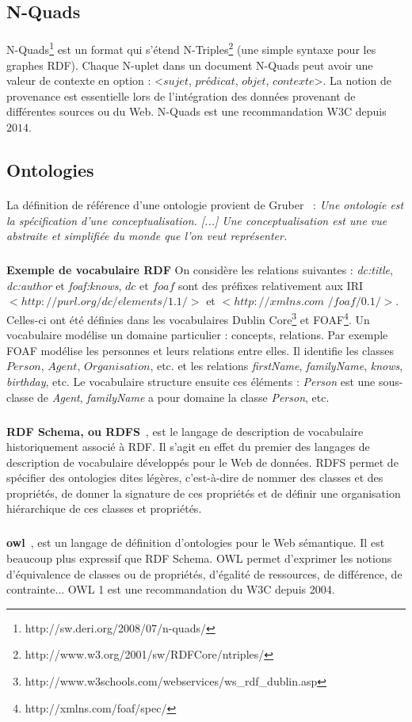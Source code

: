 \subsection{N-Quads}
\paragraph{}
N-Quads\footnote{http://sw.deri.org/2008/07/n-quads/} est un format qui s'étend N-Triples\footnote{http://www.w3.org/2001/sw/RDFCore/ntriples/} (une simple syntaxe pour les graphes RDF). Chaque N-uplet dans un document N-Quads peut avoir une valeur de contexte en option : <$sujet$, $prédicat$, $objet$, $contexte$>. La notion de provenance est essentielle lors de l'intégration des données provenant de différentes sources ou du Web. N-Quads est une recommandation W3C depuis $2014$.
\subsection{Ontologies}
\paragraph{}
La définition de référence d’une ontologie provient de Gruber~\cite{gruber1995} : {\it Une ontologie est la spécification d’une conceptualisation. [...] Une conceptualisation est une vue abstraite et simplifiée du monde que l’on veut représenter.} 
\subparagraph{}
\textbf{Exemple de vocabulaire RDF} On considère les relations suivantes : \textit{dc:title}, \textit{dc{:}author} et \textit{foaf{:}knows}, $dc$ et $foaf$ sont des préfixes relativement aux IRI $<http://purl.org/dc/elements/1.1/>$ et $<http://xmlns.com$
$/foaf/0.1/>$. Celles-ci ont été définies dans les vocabulaires Dublin Core\footnote{http://www.w3schools.com/webservices/ws\_rdf\_dublin.asp} et FOAF\footnote{http://xmlns.com/foaf/spec/}. Un vocabulaire modélise un domaine particulier : concepts, relations. Par exemple FOAF modélise les personnes et leurs relations entre elles. Il identifie les classes $Person$, $Agent$, $Organisation$, etc. et les relations \textit{firstName}, \textit{familyName}, \textit{knows}, \textit{birthday}, etc. Le vocabulaire structure ensuite ces  éléments : \textit{Person} est une sous-classe de \textit{Agent}, \textit{familyName} a pour domaine la classe \textit{Person}, etc.
\subparagraph{}
\textbf{RDF Schema, ou RDFS}~\cite{RDF_Schema_W3C:04}, est le langage de description de vocabulaire historiquement associé à RDF. Il s'agit en effet du premier des langages de description de vocabulaire développés pour le Web de données. RDFS permet de spécifier des ontologies dites légères, c'est-à-dire de nommer des classes et des propriétés, de donner la signature de ces propriétés et de définir une organisation hiérarchique de ces classes et propriétés.
\subparagraph{}
\textbf{\gls{owl}}~\cite{OWL_Overview_W3C:04}, est un langage de définition d'ontologies pour le Web sémantique. Il est beaucoup plus expressif que RDF Schema. OWL permet d'exprimer les notions d'équivalence de classes ou de propriétés, d'égalité de ressources, de différence, de contrainte... OWL 1 est une recommandation du W3C depuis 2004.
\newpage

